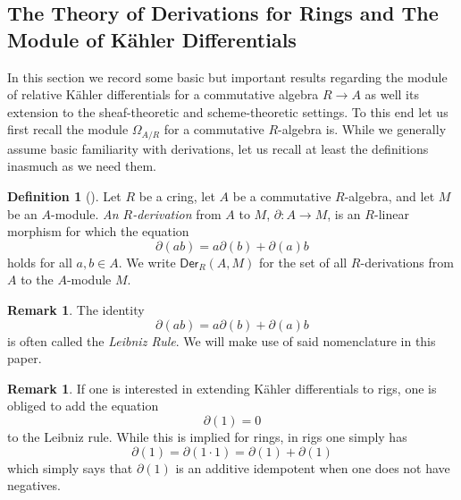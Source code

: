 \documentclass{amsart}
\newtheorem{lemma}[equation]{Lemma}
\theoremstyle{definition}
\newtheorem{remark}[equation]{Remark}
\newtheorem{definition}[equation]{Definition}
\newcommand{\Kah}[2]{\Omega_{{#1}/{#2}}}
\numberwithin{equation}{subsection}
\begin{document}
\subsection{The Theory of Derivations for Rings and The Module of K{\"a}hler Differentials}\label{Subsection:Derivations for rings}

In this section we record some basic but important results regarding the module of relative K{\"a}hler differentials for a commutative algebra $R \to A$ as well its extension to the sheaf-theoretic and scheme-theoretic settings. To this end let us first recall the module $\Kah{A}{R}$  for a commutative $R$-algebra is. While we generally assume basic familiarity with derivations, let us recall at least the definitions inasmuch as we need them.

\begin{definition}[{\cite[Definition 4.1]{RickRobinRobertTim}}]
	Let $R$ be a cring, let $A$ be a commutative $R$-algebra, and let $M$ be an $A$-module. \emph{An $R$-derivation} from $A$ to $M$, $\partial:A \to M$, is an $R$-linear morphism for which the equation
	\[
	\partial(ab) = a\partial(b) + \partial(a)b
	\]
	holds for all $a, b \in A$. We write $\mathsf{Der}_R(A,M)$ for the set of all $R$-derivations from $A$ to the $A$-module $M$.
\end{definition}
\begin{remark}
	The identity
	\[
	\partial(ab) = a\partial(b) + \partial(a)b
	\]
	is often called the \emph{Leibniz Rule}. We will make use of said nomenclature in this paper.
\end{remark}
\begin{remark}
If one is interested in extending K{\"a}hler differentials to rigs, one is obliged to add the equation
\[
\partial(1) = 0
\]
to the Leibniz rule. While this is implied for rings, in rigs one simply has
\[
\partial(1) = \partial(1\cdot 1) = \partial(1) + \partial(1)
\]
which simply says that $\partial(1)$ is an additive idempotent when one does not have negatives.
\end{remark}
%
%
\end{document}
